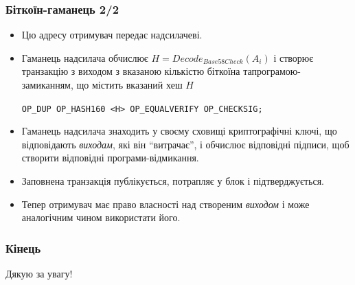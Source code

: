 \documentclass{beamer}
\begin{document}
\begin{frame}[fragile]
  \frametitle{Біткоїн-гаманець 2/2}
  \begin{itemize}
  \item Цю адресу отримувач передає надсилачеві.
  \item Гаманець надсилача обчислює $H = Decode_{Base58Check}(A_i)$ і створює
    транзакцію з виходом з вказаною кількістю біткоїна тапрограмою-замиканням,
    що містить вказаний хеш $H$
    \begin{center}
      \tiny\texttt{OP_DUP OP_HASH160 <H> OP_EQUALVERIFY OP_CHECKSIG;}
    \end{center}
  \item Гаманець надсилача знаходить у своєму сховищі криптографічні ключі, що
    відповідають \textit{виходам}, які він ``витрачає'', і обчислює відповідні
    підписи, щоб створити відповідні програми-відмикання.
  \item Заповнена транзакція публікується, потрапляє у блок і підтверджується.
  \item Тепер отримувач має право власності над створеним \textit{виходом} і
    може аналогічним чином використати його.
  \end{itemize}
\end{frame}

\begin{frame}
  \frametitle{Кінець}
  \begin{center}
    Дякую за увагу!
  \end{center}
\end{frame}
\end{document}
